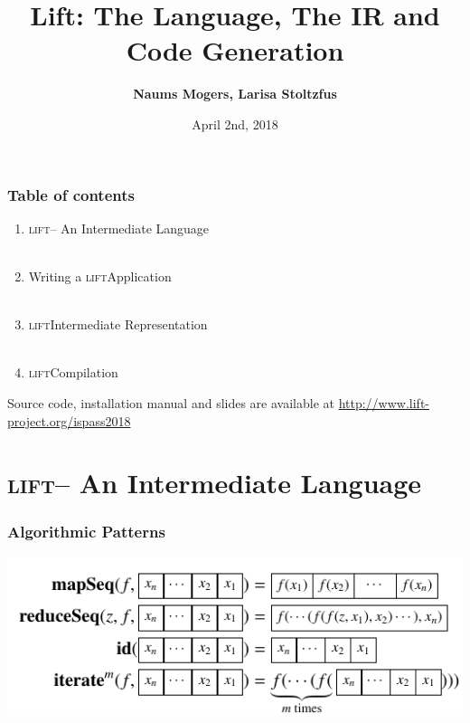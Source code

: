 \documentclass[10pt,usetotalslideindicator]{beamer}
\title{Lift: The Language, The IR and Code Generation}
\date{April 2nd, 2018}
\author{\textbf{Naums Mogers, Larisa Stoltzfus}}
\institute{University of Edinburgh}
\newcommand{\lift}{\textsc{lift}\space}
\begin{document}
\begin{frame}
\maketitle
\end{frame}

\begin{frame}
\frametitle{Table of contents}
\begin{enumerate}
	\item \lift -- An Intermediate Language\\
	\
	\item Writing a \lift Application\\
	\
	\item \lift Intermediate Representation\\
	\
	\item \lift Compilation
\end{enumerate}
    \vspace{1cm}
\begin{center}
Source code, installation manual and slides are available at
\textcolor{blue}{\url{http://www.lift-project.org/ispass2018}}
\end{center}

\end{frame}

\section{\lift -- An Intermediate Language}
\begin{frame}
\frametitle{Algorithmic Patterns}
    \begin{block}{}
        \begin{center}
            \includegraphics[width=.85\textwidth]{../images/algorithmic_patterns.pdf}
        \end{center}
    \end{block}
\end{frame}
\end{document}
